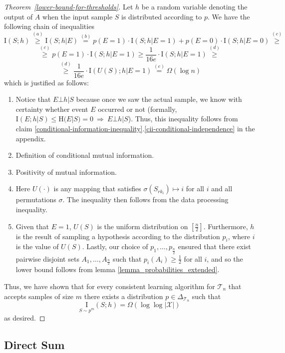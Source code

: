\documentclass[final,12pt]{colt2018}
\newcommand{\HH}{\mathrm{H}}
\newcommand{\mc}[1]{\mathcal{#1}}
\newcommand{\cX}{\mc{X}}
\newcommand{\cT}{\mc{T}}
\newcommand{\II}[1]{\mathrm{I}\left(#1\right)}
\newcommand{\I}[2]{\underset{#1}{\mathrm{I}}\left(#2\right)}
\begin{document}
\begin{proof}[Theorem~\ref{lower-bound-for-thresholds}]
	Let $h$ be a random variable denoting the output of $A$ when the input sample $S$ is distributed according to $p$. We have the following chain of inequalities
	\[
	\II{S;h} \stackrel{(a)}{\geq} \II{S;h|E} \stackrel{(b)}{=} p(E=1)\cdot \II{S;h|E=1} + p(E=0)\cdot \II{S;h|E=0} \stackrel{(c)}{\geq}
	\]
	\[
	\stackrel{(c)}{\geq} p(E=1)\cdot \II{S;h|E=1} \geq \frac{1}{16e}\cdot \II{S;h|E=1} \stackrel{(d)}{\geq} 
	\]
	\[
	\stackrel{(d)}{\geq} \frac{1}{16e}\cdot \II{U(S);h|E=1} \stackrel{(e)}{=} \Omega(\log n)
	\]
	which is justified as follows:
	\begin{enumerate}[label=(\alph*)]
		\item {Notice that $E \bot h | S$ because once we saw the actual sample, we know with certainty whether event $E$ occurred or not (formally, $\II{E;h|S} \leq \HH(E|S) = 0 \ \Longrightarrow \ E \bot h | S$). Thus, this inequality follows from claim \ref{conditional-information-inequality}.\ref{cii-conditional-independence} in the appendix.}
		\item {Definition of conditional mutual information.}
		\item {Positivity of mutual information.}
		\item {Here $U(\cdot)$ is any mapping that satisfies $\sigma(S_{rk_i}) \mapsto i$ for all $i$ and all permutations $\sigma$. The inequality then follows from the data processing inequality.}
		\item {Given that $E=1$, $U(S)$ is the uniform distribution on $[\frac{n}{2}]$. Furthermore, $h$ is the result of sampling a hypothesis according to the distribution $p_i$, where $i$ is the value of $U(S)$. Lastly, our choice of $p_1,\dots,p_{\frac{n}{2}}$ ensured that there exist pairwise disjoint sets $A_1,\dots,A_{\frac{n}{2}}$ such that $p_i(A_i)\geq \frac{1}{2}$ for all $i$, and so the lower bound follows from lemma \ref{lemma_probabilities_extended}.}
	\end{enumerate}
	
	Thus, we have shown that for every consistent learning algorithm for $\cT_n$ that accepts samples of size $m$ there exists a distribution $p\in\Delta_{\cT_n}$ such that
	\[
	\I{S \sim p^m}{S;h} = \Omega(\log \log |\cX|)
	\]
	as desired.
\end{proof}

\subsection{Direct Sum}
\end{document}
